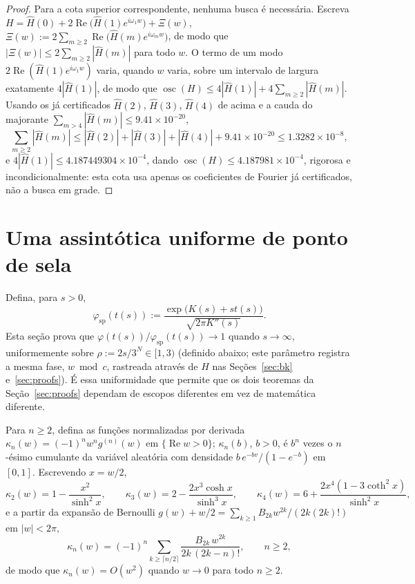 \documentclass[11pt]{amsart}
\theoremstyle{plain}
\theoremstyle{definition}
\theoremstyle{remark}
\begin{document}
\begin{proof}
Para a cota superior correspondente, nenhuma busca é necessária. Escreva $H = \hat H(0) +
2\operatorname{Re}\bigl(\hat H(1)e^{i\omega_1 w}\bigr) + \Xi(w)$, $\Xi(w) :=
2\sum_{m\ge2}\operatorname{Re}\bigl(\hat H(m) e^{i\omega_m w}\bigr)$, de modo que
$|\Xi(w)|\le2\sum_{m\ge2}|\hat H(m)|$ para todo $w$. O termo de um modo
$2\operatorname{Re}(\hat H(1)e^{i\omega_1w})$ varia, quando $w$ varia, sobre um intervalo de
largura exatamente $4|\hat H(1)|$, de modo que $\operatorname{osc}(H) \le 4|\hat H(1)| +
4\sum_{m\ge2}|\hat H(m)|$. Usando os já certificados $\hat H(2)$, $\hat H(3)$, $\hat H(4)$ de acima
e a cauda do majorante $\sum_{m>4}|\hat H(m)|\le9.41\times10^{-20}$,
\[
\sum_{m\ge2}|\hat H(m)| \le |\hat H(2)|+|\hat H(3)|+|\hat H(4)|+9.41\times10^{-20} \le
1.3282\times10^{-8},
\]
e $4|\hat H(1)| \le 4.187449304\times10^{-4}$, dando $\operatorname{osc}(H) \le
4.187981\times10^{-4}$, rigorosa e incondicionalmente: esta cota usa apenas os coeficientes de
Fourier já certificados, não a busca em grade.
\end{proof}

\section{Uma assintótica uniforme de ponto de sela}
\label{sec:formulaA}

Defina, para $s>0$,
\[
\varphi_{\mathrm{sp}}(t(s)) := \frac{\exp\bigl(K(s)+st(s)\bigr)}{\sqrt{2\pi K''(s)}}.
\]
Esta seção prova que $\varphi(t(s))/\varphi_{\mathrm{sp}}(t(s)) \to 1$ quando $s \to \infty$,
uniformemente sobre $\rho:=2s/3^N\in[1,3)$ (definido abaixo; este parâmetro registra a mesma fase,
$w\bmod c$, rastreada através de $H$ nas Seções~\ref{sec:bk} e~\ref{sec:proofs}). É essa uniformidade
que permite que os dois teoremas da Seção~\ref{sec:proofs} dependam de escopos diferentes em vez de
matemática diferente.

Para $n \ge 2$, defina as funções normalizadas por derivada $\kappa_n(w) = (-1)^n w^n g^{(n)}(w)$ em
$\{\operatorname{Re} w > 0\}$; $\kappa_n(b)$, $b>0$, é $b^n$ vezes o $n$-ésimo cumulante da variável
aleatória com densidade $b\,e^{-bv}/(1-e^{-b})$ em $[0,1]$. Escrevendo $x=w/2$,
\[
\kappa_2(w) = 1 - \frac{x^2}{\sinh^2 x}, \qquad
\kappa_3(w) = 2 - \frac{2x^3\cosh x}{\sinh^3 x}, \qquad
\kappa_4(w) = 6 + \frac{2x^4(1-3\coth^2 x)}{\sinh^2 x},
\]
e a partir da expansão de Bernoulli $g(w)+w/2 = \sum_{k\ge1} B_{2k}w^{2k}/(2k(2k)!)$ em $|w|<2\pi$,
\[
\kappa_n(w) = (-1)^n\!\!\sum_{k\ge\lceil n/2\rceil}\!\! \frac{B_{2k}\,w^{2k}}{2k\,(2k-n)!}, \qquad n\ge2,
\]
de modo que $\kappa_n(w) = O(w^2)$ quando $w \to 0$ para todo $n \ge 2$.
\end{document}
